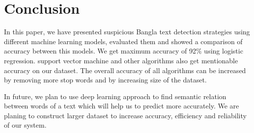 \section{\textbf{Conclusion}}
In this paper, we have presented suspicious Bangla text detection strategies using different machine learning models, evaluated them and showed a comparison of accuracy between this models. We get maximum accuracy of 92$\%$ using logistic regression. support vector machine and other algorithms also get mentionable accuracy on our dataset. The overall accuracy of all algorithms can be increased by removing more stop words and by increasing size of the dataset.\par
\vspace{0.2cm}
In future, we plan to use deep learning approach to find semantic relation between words of a text which will help us to predict more accurately. We are planing to construct larger dataset to increase accuracy, efficiency and reliability of our system.